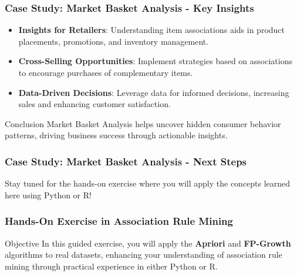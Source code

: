 \documentclass[aspectratio=169]{beamer}
\begin{document}
\begin{frame}[fragile]
    \frametitle{Case Study: Market Basket Analysis - Key Insights}
    \begin{itemize}
        \item \textbf{Insights for Retailers}: Understanding item associations aids in product placements, promotions, and inventory management.
        \item \textbf{Cross-Selling Opportunities}: Implement strategies based on associations to encourage purchases of complementary items.
        \item \textbf{Data-Driven Decisions}: Leverage data for informed decisions, increasing sales and enhancing customer satisfaction.
    \end{itemize}

    \begin{block}{Conclusion}
        Market Basket Analysis helps uncover hidden consumer behavior patterns, driving business success through actionable insights.
    \end{block}
\end{frame}

\begin{frame}[fragile]
    \frametitle{Case Study: Market Basket Analysis - Next Steps}
    Stay tuned for the hands-on exercise where you will apply the concepts learned here using Python or R!
\end{frame}

\begin{frame}[fragile]
    \frametitle{Hands-On Exercise in Association Rule Mining}
    \begin{block}{Objective}
        In this guided exercise, you will apply the \textbf{Apriori} and \textbf{FP-Growth} algorithms to real datasets, enhancing your understanding of association rule mining through practical experience in either Python or R.
    \end{block}
\end{frame}
\end{document}
